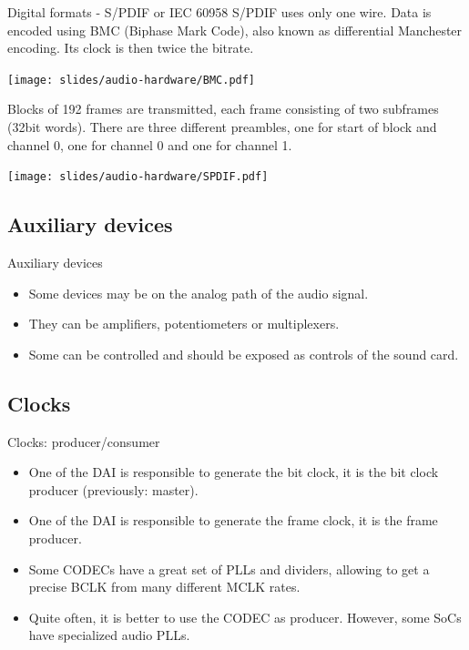 \begin{frame}{Digital formats - S/PDIF or IEC 60958}
  S/PDIF uses only one wire. Data is encoded using BMC (Biphase Mark
  Code), also known as differential Manchester encoding. Its clock is
  then twice the bitrate.
  \begin{center}
    \texttt{[image: slides/audio-hardware/BMC.pdf]}\\
  \end{center}
  Blocks of 192 frames are transmitted, each frame consisting of two
  subframes (32bit words). There are three different preambles, one
  for start of block and channel 0, one for channel 0 and one for
  channel 1.
  \begin{center}
    \texttt{[image: slides/audio-hardware/SPDIF.pdf]}\\
  \end{center}
\end{frame}

\subsection{Auxiliary devices}

\begin{frame}{Auxiliary devices}
  \begin{itemize}
  \item Some devices may be on the analog path of the audio signal.
  \item They can be amplifiers, potentiometers or multiplexers.
  \item Some can be controlled and should be exposed as controls of
    the sound card.
  \end{itemize}
\end{frame}

\subsection{Clocks}

\begin{frame}{Clocks: producer/consumer}
  \begin{itemize}
  \item One of the DAI is responsible to generate the bit clock, it is
    the bit clock producer (previously: master).
  \item One of the DAI is responsible to generate the frame clock, it is
    the frame producer.
  \item Some CODECs have a great set of PLLs and dividers, allowing to get a
    precise BCLK from many different MCLK rates.
  \item Quite often, it is better to use the CODEC as producer. However,
    some SoCs have specialized audio PLLs.
  \end{itemize}
\end{frame}
